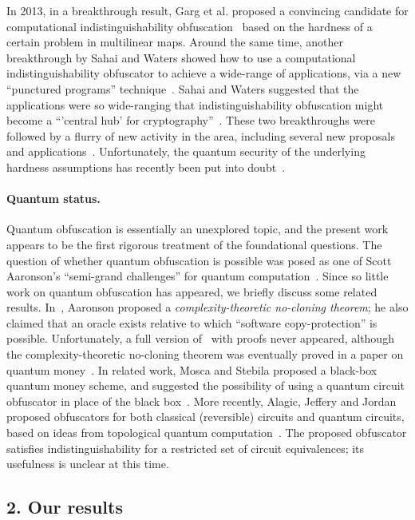 \documentclass[11pt]{article}
\numberwithin{equation}{section}
\begin{document}
{In 2013, in a breakthrough result, Garg et al. proposed a convincing candidate for computational indistinguishability obfuscation~\cite{GGHRSW13} based on the hardness of a certain problem in multilinear maps. Around the same time, another breakthrough by Sahai and Waters showed how to use a computational indistinguishability obfuscator to achieve a wide-range of applications, via a new ``punctured programs'' technique~\cite{SW14}. Sahai and Waters suggested that the applications were so wide-ranging that indistinguishability obfuscation might become a ``'central hub' for cryptography''~\cite{SW14}. These two breakthroughs were followed by a flurry of new activity in the area, including several new proposals and applications~\cite{BGKPS14, BCCGKPR14, BZ14, BR14, GGHW14, HSW14}. Unfortunately, the quantum security of the underlying hardness assumptions has recently been put into doubt~\cite{Pei15}.

\paragraph{Quantum status.} Quantum obfuscation is essentially an unexplored topic, and the present work appears to be the first rigorous treatment of the foundational questions. The question of whether quantum obfuscation is possible was posed as one of Scott Aaronson's ``semi-grand challenges'' for quantum computation~\cite{Aar05}. Since so little work on quantum obfuscation has appeared, we briefly discuss some related results. In~\cite{Aar09}, Aaronson proposed a \emph{complexity-theoretic no-cloning theorem}; he also claimed that an oracle exists relative to which ``software copy-protection'' is possible. Unfortunately, a full version of~\cite{Aar09} with proofs never appeared, although the complexity-theoretic no-cloning theorem was eventually proved in a paper on quantum money~\cite{AC12}. In related work, Mosca and Stebila proposed a black-box quantum money scheme, and suggested the possibility of using a quantum circuit obfuscator in place of the black box~\cite{MS10}. More recently, Alagic, Jeffery and Jordan proposed obfuscators for both classical (reversible) circuits and quantum circuits, based on ideas from topological quantum computation~\cite{ASS14}. The proposed obfuscator satisfies indistinguishability for a restricted set of circuit equivalences; its usefulness is unclear at this time.

\subsection*{2. Our results}\label{sec:intro}

}
\end{document}
